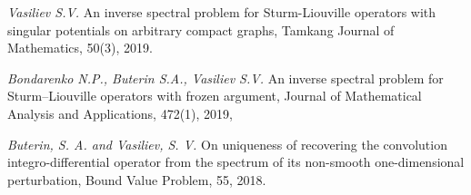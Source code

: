 {\small
\begin{zitemize}
\item  \textit{Vasiliev S.V.} An inverse spectral problem for Sturm-Liouville operators with singular potentials on arbitrary compact graphs, Tamkang Journal of Mathematics, 50(3), 2019.

\item \textit{Bondarenko N.P., Buterin S.A., Vasiliev S.V.} An inverse spectral problem for Sturm–Liouville operators with frozen argument,
Journal of Mathematical Analysis and Applications, 472(1), 2019,

\item \textit{Buterin, S. A. and Vasiliev, S. V.} On uniqueness of recovering the convolution integro-differential operator from the spectrum of its non-smooth one-dimensional perturbation, Bound Value Problem, 55, 2018.
\end{zitemize}
}
